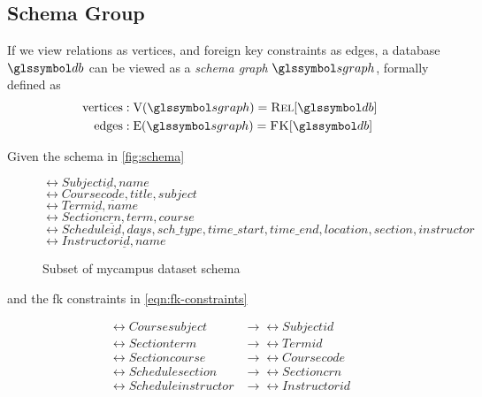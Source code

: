 	\subsection{Schema Group}
		\begin{defn}
		\label{def:schema-graph}
			If we view relations as vertices, and foreign key constraints as edges, a database \(\db\) can be viewed as a \emph{schema graph} \(\sgraph{}\), formally defined as
			\begin{align}
				\text{vertices} &: \text{V}(\sgraph) = \relations{\db} \\
				\text{edges} &: \text{E}(\sgraph) = \fks{\db}
			\end{align}
		\end{defn}
		
		\begin{ex}
			Given the schema in \vref{fig:schema}
			
			\begin{figure}
				\centering
				
				\(\rel{Subject}{\underline{id}, name}\) \\
				\(\rel{Course}{\underline{code}, title, subject}\) \\
				\(\rel{Term}{\underline{id}, name}\) \\
				\(\rel{Section}{\underline{crn}, term, course}\) \\
				\(\rel{Schedule}{\underline{id}, days, sch\_type, time\_start, time\_end, location, section, instructor}\) \\
				\(\rel{Instructor}{\underline{id}, name}\) \\
				
				\caption{Subset of mycampus dataset schema}
				\label{fig:schema}
			\end{figure}
			
			and the \gls{fk} constraints in \vref{eqn:fk-constraints}
			
			\begin{figure}
				\begin{align*}
					\rel{Course}{subject} &\rightarrow \rel{Subject}{id} \\
					\rel{Section}{term} &\rightarrow \rel{Term}{id} \\
					\rel{Section}{course} &\rightarrow \rel{Course}{code} \\
					\rel{Schedule}{section} &\rightarrow \rel{Section}{crn} \\
					\rel{Schedule}{instructor} &\rightarrow \rel{Instructor}{id}
				\end{align*}
				

\end{figure}
\end{ex}
